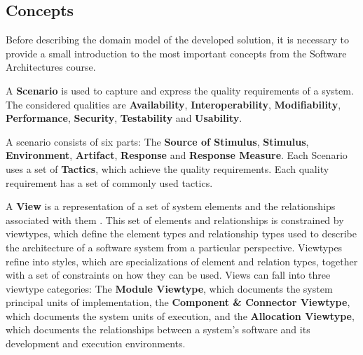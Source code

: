 \documentclass[conference]{IEEEtran}
\begin{document}
\subsection{Concepts}
\label{domainModel:SAConcepts}
Before describing the domain model of the developed solution, it is necessary to provide a small introduction to the most important concepts from the Software Architectures course.

A \textbf{Scenario} is used to capture and express the quality requirements of a system. The considered qualities are \textbf{Availability}, \textbf{Interoperability}, \textbf{Modifiability}, \textbf{Performance}, \textbf{Security}, \textbf{Testability} and \textbf{Usability}.

A scenario consists of six parts\cite{bass2003software}: The \textbf{Source of Stimulus}, \textbf{Stimulus}, \textbf{Environment}, \textbf{Artifact}, \textbf{Response} and \textbf{Response Measure}. Each Scenario uses a set of \textbf{Tactics}, which achieve the quality requirements. Each quality requirement has a set of commonly used tactics.

A \textbf{View} is a representation of a set of system elements and the relationships associated with them \cite{clements2003documenting}. This set of elements and relationships is constrained by viewtypes, which define the element types and relationship types used to describe the architecture of a software system from a particular perspective. Viewtypes refine into styles, which are specializations of element and relation types, together with a set of constraints on how they can be used. Views can fall into three viewtype categories: The \textbf{Module Viewtype}, which documents the system principal units of implementation, the \textbf{Component \& Connector Viewtype}, which documents the system units of execution, and the \textbf{Allocation Viewtype}, which documents the relationships between a system's software and its development and execution environments. 
\end{document}
